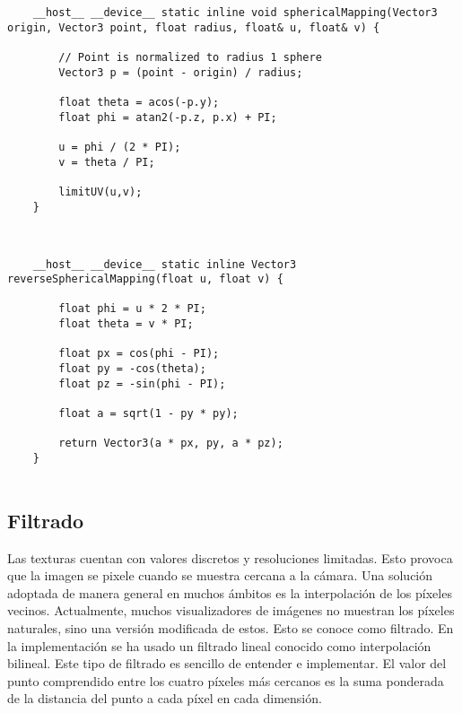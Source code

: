 \begin{minipage}[c]{0.95\textwidth}
\begin{lstlisting}
    __host__ __device__ static inline void sphericalMapping(Vector3 origin, Vector3 point, float radius, float& u, float& v) {

        // Point is normalized to radius 1 sphere
        Vector3 p = (point - origin) / radius;

        float theta = acos(-p.y);
        float phi = atan2(-p.z, p.x) + PI;

        u = phi / (2 * PI);
        v = theta / PI;

        limitUV(u,v);
    }
	
\end{lstlisting}
\end{minipage}

\begin{minipage}[c]{0.95\textwidth}
\begin{lstlisting}
		
	__host__ __device__ static inline Vector3 reverseSphericalMapping(float u, float v) {

        float phi = u * 2 * PI;
        float theta = v * PI;

        float px = cos(phi - PI);
        float py = -cos(theta);
        float pz = -sin(phi - PI);

        float a = sqrt(1 - py * py);

        return Vector3(a * px, py, a * pz);
    }
	
\end{lstlisting}
\end{minipage}


\subsection{Filtrado}
			
Las texturas cuentan con valores discretos y resoluciones limitadas. Esto provoca que la imagen se pixele cuando se muestra cercana a la cámara. Una solución adoptada de manera general en muchos ámbitos es la interpolación de los píxeles vecinos. Actualmente, muchos visualizadores de imágenes no muestran los píxeles naturales, sino una versión modificada de estos. Esto se conoce como filtrado. En la implementación se ha usado un filtrado lineal conocido como interpolación bilineal. Este tipo de filtrado es sencillo de entender e implementar. El valor del punto  comprendido entre los cuatro píxeles más cercanos es la suma ponderada de la distancia del punto a cada píxel en cada dimensión. 	
	
